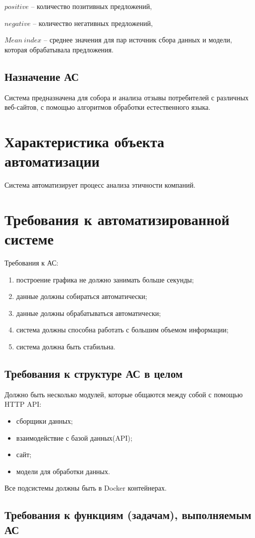 {\begin{itemize}
        \(positive\) -- количество позитивных предложений,

        \(negative\) -- количество негативных предложений,

        \(Mean\ index\) -- среднее значения для пар источник сбора данных и модели, которая обрабатывала предложения.
\end{itemize}


\subsection{Назначение АС}
Система предназначена для собора и анализа отзывы потребителей с различных веб-сайтов, с помощью алгоритмов обработки естественного языка.
\section{Характеристика объекта автоматизации}
Система автоматизирует процесс анализа этичности компаний.
\section{Требования к автоматизированной системе}
Требования к АС:
\begin{enumerate}
  \item построение графика не должно занимать больше секунды;
  \item данные должны собираться автоматически;
  \item данные должны обрабатываться автоматически;
  \item система должны способна работать с большим объемом информации;
  \item система должна быть стабильна.
\end{enumerate}
\subsection{Требования к структуре АС в целом}
Должно быть несколько модулей, которые общаются между собой с помощью HTTP API:
\begin{itemize}
  \item сборщики данных;
  \item взаимодействие с базой данных(API);
  \item сайт;
  \item модели для обработки данных.
\end{itemize}
Все подсистемы должны быть в Docker контейнерах.
\subsection{Требования к функциям (задачам), выполняемым АС}
}
